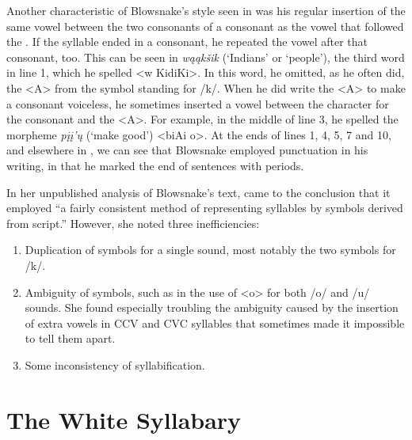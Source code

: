 \documentclass[output=paper]{LSP/langsci}
\begin{document}
Another characteristic of Blowsnake's  style seen in  was his regular insertion of the same vowel between the two consonants of a consonant  as the vowel that followed the . If the syllable ended in a consonant, he repeated the vowel after that consonant, too. This can be seen in \emph{w\k{a}\k{a}k\v{s}ik} (`Indians' or `people'), the third word in line 1, which he spelled <w KidiKi>. In this word, he omitted, as he often did, the <A> from the symbol standing for /k/. When he did write the <A> to make a consonant voiceless, he sometimes inserted a vowel between the character for the consonant and the <A>. For example, in the middle of line 3, he spelled the morpheme \emph{p\k{i}\k{i}'\k{u}} (`make good') <biAi o>. At the ends of lines 1, 4, 5, 7 and 10, and elsewhere in , we can see that Blowsnake employed punctuation in his writing, in that he marked the end of sentences with periods.

In her unpublished analysis of Blowsnake's  text, \citeauthor{Susman1939} came to the conclusion that it employed ``a fairly consistent method of representing syllables by symbols derived from  script.'' However, she noted three inefficiencies: 


\begin{enumerate}
\item{Duplication of symbols for a single sound, most notably the two symbols for /k/.}
\item{Ambiguity of symbols, such as in the use of <o> for both /o/ and /u/ sounds. She found especially troubling the ambiguity caused by the insertion of extra vowels in CCV and CVC syllables that sometimes made it impossible to tell them apart.}
\item{Some inconsistency of syllabification.}
\end{enumerate}

\section{The White Syllabary}
\end{document}
